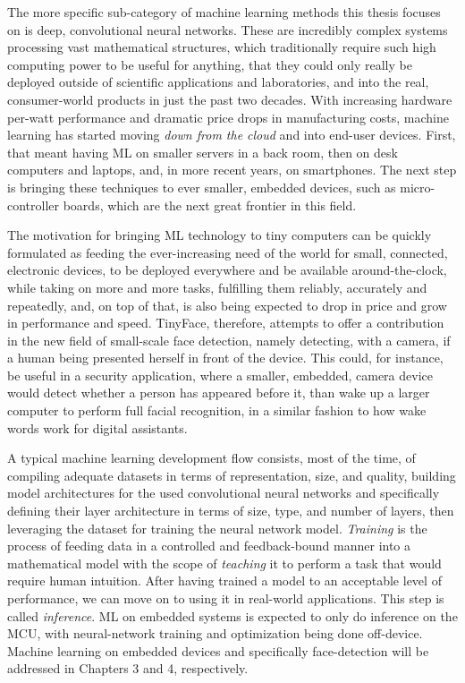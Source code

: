 The more specific sub-category of machine learning methods this thesis focuses on is deep, convolutional neural networks. These are incredibly complex systems processing vast mathematical structures, which traditionally require such high computing power to be useful for anything, that they could only really be deployed outside of scientific applications and laboratories, and into the real, consumer-world products in just the past two decades. With increasing hardware per-watt performance and dramatic price drops in manufacturing costs, machine learning has started moving \textit{down from the cloud} and into end-user devices. First, that meant having ML on smaller servers in a back room, then on desk computers and laptops, and, in more recent years, on smartphones. The next step is bringing these techniques to ever smaller, embedded devices, such as micro-controller boards, which are the next great frontier in this field. \par
The motivation for bringing ML technology to tiny computers can be quickly formulated as feeding the ever-increasing need of the world for small, connected, electronic devices, to be deployed everywhere and be available around-the-clock, while taking on more and more tasks, fulfilling them reliably, accurately and repeatedly, and, on top of that, is also being expected to drop in price and grow in performance and speed. TinyFace, therefore, attempts to offer a contribution in the new field of small-scale face detection, namely detecting, with a camera, if a human being presented herself in front of the device. This could, for instance, be useful in a security application, where a smaller, embedded, camera device would detect whether a person has appeared before it, than wake up a larger computer to perform full facial recognition, in a similar fashion to how wake words work for digital assistants. \par
A typical machine learning development flow consists, most of the time, of compiling adequate datasets in terms of representation, size, and quality, building model architectures for the used convolutional neural networks and specifically defining their layer architecture in terms of size, type, and number of layers, then leveraging the dataset for training the neural network model. \textit{Training} is the process of feeding data in a controlled and feedback-bound manner into a mathematical model with the scope of \textit{teaching} it to perform a task that would require human intuition. After having trained a model to an acceptable level of performance, we can move on to using it in real-world applications. This step is called \textit{inference}. ML on embedded systems is expected to only do inference on the MCU, with neural-network training and optimization being done off-device. Machine learning on embedded devices and specifically face-detection will be addressed in Chapters 3 and 4, respectively. \par
